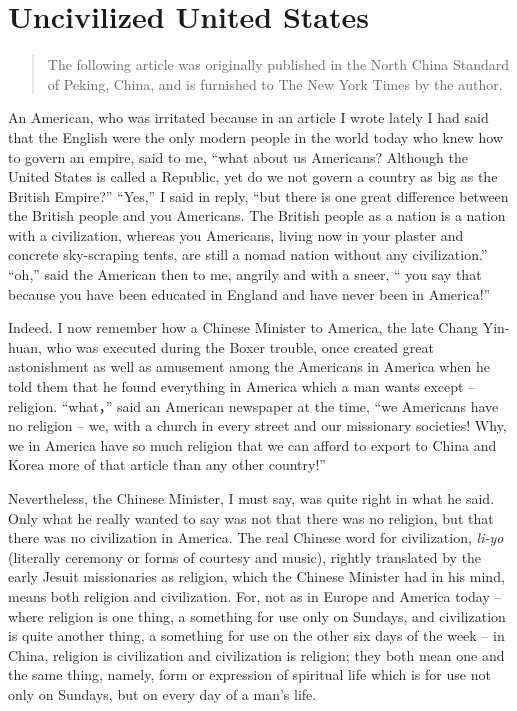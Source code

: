 
\chapter{Uncivilized United States}

\begin{quotation}
The following article was originally published in the North China Standard of Peking, China, and is furnished to {The New York Times} by the author. 
\end{quotation}

An American,
who was irritated because in an article I wrote lately I had said that the English were the only modern people in the world today who knew how to govern an empire,
said to me,
``what about us Americans?
Although the United States is called a Republic,
yet do we not govern a country as big as the British Empire?''
``Yes,'' I said in reply, ``but there is one great difference between the British people and you Americans.
The British people as a nation is a nation with a civilization,
whereas you Americans, living now in your plaster and concrete sky-scraping tents,
are still a nomad nation without any civilization.''
``oh,'' said the American then to me, angrily and with a sneer,
`` you say that because you have been educated in England and have never been in America!'' 

Indeed. I now remember how a Chinese Minister to America,
the late Chang Yin-huan, who was executed during the Boxer trouble,
once created great astonishment as well as amusement among the Americans in America when he told them that he found everything in America which a man wants except -- religion.
``what，'' said an American newspaper at the time,
``we Americans have no religion -- we, with a church in every street and our missionary societies!
Why, we in America have so much religion that we can afford to export to China and Korea more of that article than any other country!''

Nevertheless, the Chinese Minister, I must say, was quite right in what he said.
Only what he really wanted to say was not that there was no religion,
but that there was no civilization in America.
The real Chinese word for civilization, \emph{li-yo}
(literally ceremony or forms of courtesy and music),
rightly translated by the early Jesuit missionaries as religion,
which the Chinese Minister had in his mind, means both religion and civilization. For, not as in Europe and America today -- where religion is one thing, a something for use only on Sundays, and civilization is quite another thing, a something for use on the other six days of the week -- in China, religion is civilization and civilization is religion; they both mean one and the same thing, namely, form or expression of spiritual life which is for use not only on Sundays, but on every day of a man's life.

